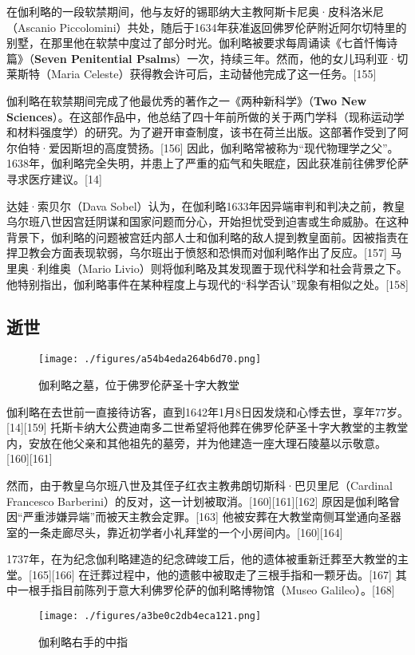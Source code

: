 在伽利略的一段软禁期间，他与友好的锡耶纳大主教阿斯卡尼奥·皮科洛米尼（Ascanio Piccolomini）共处，随后于1634年获准返回佛罗伦萨附近阿尔切特里的别墅，在那里他在软禁中度过了部分时光。伽利略被要求每周诵读《七首忏悔诗篇》（\textbf{Seven Penitential Psalms}）一次，持续三年。然而，他的女儿玛利亚·切莱斯特（Maria Celeste）获得教会许可后，主动替他完成了这一任务。[155]  

伽利略在软禁期间完成了他最优秀的著作之一《两种新科学》（\textbf{Two New Sciences}）。在这部作品中，他总结了四十年前所做的关于两门学科（现称运动学和材料强度学）的研究。为了避开审查制度，该书在荷兰出版。这部著作受到了阿尔伯特·爱因斯坦的高度赞扬。[156] 因此，伽利略常被称为“现代物理学之父”。1638年，伽利略完全失明，并患上了严重的疝气和失眠症，因此获准前往佛罗伦萨寻求医疗建议。[14]  

达娃·索贝尔（Dava Sobel）认为，在伽利略1633年因异端审判和判决之前，教皇乌尔班八世因宫廷阴谋和国家问题而分心，开始担忧受到迫害或生命威胁。在这种背景下，伽利略的问题被宫廷内部人士和伽利略的敌人提到教皇面前。因被指责在捍卫教会方面表现软弱，乌尔班出于愤怒和恐惧而对伽利略作出了反应。[157] 马里奥·利维奥（Mario Livio）则将伽利略及其发现置于现代科学和社会背景之下。他特别指出，伽利略事件在某种程度上与现代的“科学否认”现象有相似之处。[158]
\subsection{逝世}
\begin{figure}[ht]
\centering
\texttt{[image: ./figures/a54b4eda264b6d70.png]}
\caption{伽利略之墓，位于佛罗伦萨圣十字大教堂} \label{fig_JLL_11}
\end{figure}
伽利略在去世前一直接待访客，直到1642年1月8日因发烧和心悸去世，享年77岁。[14][159] 托斯卡纳大公费迪南多二世希望将他葬在佛罗伦萨圣十字大教堂的主教堂内，安放在他父亲和其他祖先的墓旁，并为他建造一座大理石陵墓以示敬意。[160][161]  

然而，由于教皇乌尔班八世及其侄子红衣主教弗朗切斯科·巴贝里尼（Cardinal Francesco Barberini）的反对，这一计划被取消。[160][161][162] 原因是伽利略曾因“严重涉嫌异端”而被天主教会定罪。[163] 他被安葬在大教堂南侧耳堂通向圣器室的一条走廊尽头，靠近初学者小礼拜堂的一个小房间内。[160][164]  

1737年，在为纪念伽利略建造的纪念碑竣工后，他的遗体被重新迁葬至大教堂的主堂。[165][166] 在迁葬过程中，他的遗骸中被取走了三根手指和一颗牙齿。[167] 其中一根手指目前陈列于意大利佛罗伦萨的伽利略博物馆（Museo Galileo）。[168]
\begin{figure}[ht]
\centering
\texttt{[image: ./figures/a3be0c2db4eca121.png]}
\caption{伽利略右手的中指} \label{fig_JLL_12}
\end{figure}
